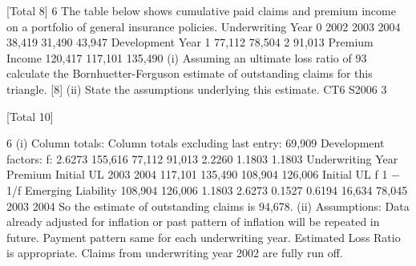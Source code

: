 \documentclass[a4paper,12pt]{article}
\begin{document}
 


[Total 8]
6
The table below shows cumulative paid claims and premium income on a portfolio of
general insurance policies.
Underwriting
Year 0
2002
2003
2004 38,419
31,490
43,947
Development Year
1
77,112
78,504
2
91,013
Premium
Income
120,417
117,101
135,490
(i) Assuming an ultimate loss ratio of 93%
calculate the Bornhuetter-Ferguson estimate of outstanding claims for this
triangle.
[8]
(ii) State the assumptions underlying this estimate.
CT6 S2006
3

[Total 10]
\newpage


6
(i)
Column totals:
Column totals excluding last entry: 69,909
Development factors:
f:
2.6273
155,616
77,112 91,013
2.2260
1.1803 1.1803
Underwriting
Year Premium Initial UL 2003
2004 117,101
135,490 108,904
126,006 Initial UL f 1 − 1/f Emerging
Liability
108,904
126,006 1.1803
2.6273 0.1527
0.6194 16,634
78,045
2003
2004
So the estimate of outstanding claims is 94,678.
(ii)
Assumptions:
Data already adjusted for inflation or past pattern of inflation will be repeated
in future.
Payment pattern same for each underwriting year.
Estimated Loss Ratio is appropriate.
Claims from underwriting year 2002 are fully run off.
\end{document}
